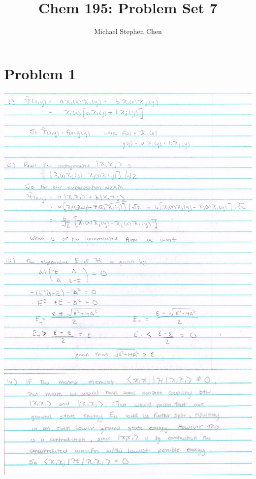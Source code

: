 \documentclass{article}
\title{Chem 195: Problem Set 7}
\author{Michael Stephen Chen}
\begin{document}
\maketitle
\pagebreak

\section*{Problem 1}

\begin{center}
\includegraphics[scale=0.75]{prob1_1}\\
\includegraphics[scale=0.75]{prob1_2}
\end{center}
\end{document}
